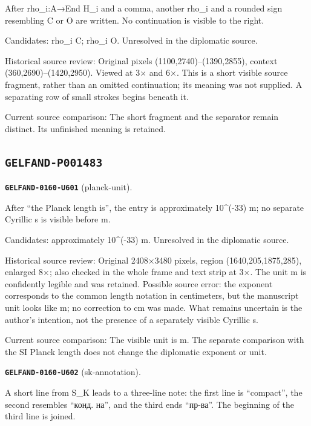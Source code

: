 After rho\_i:A→End H\_i and a comma, another rho\_i and a rounded sign resembling C or O are written. No continuation is visible to the right.\par
Candidates: rho\_i C; rho\_i O. Unresolved in the diplomatic source.\par
Historical source review: Original pixels (1100,2740)–(1390,2855), context (360,2690)–(1420,2950). Viewed at 3× and 6×. This is a short visible source fragment, rather than an omitted continuation; its meaning was not supplied. A separating row of small strokes begins beneath it.\par
Current source comparison: The short fragment and the separator remain distinct. Its unfinished meaning is retained.\par\medskip
\subsection*{\texttt{GELFAND-P001483}}
\par\noindent\leavevmode{}\label{GELFAND-0160-U601}\label{GELFAND-P001483:planck-unit}\textbf{\texttt{GELFAND-0160-U601}} (planck-unit).\nopagebreak[4]\par
After “the Planck length is”, the entry is approximately 10\textasciicircum{}(-33) m; no separate Cyrillic s is visible before m.\par
Candidates: approximately 10\textasciicircum{}(-33) m. Unresolved in the diplomatic source.\par
Historical source review: Original 2408×3480 pixels, region (1640,205,1875,285), enlarged 8×; also checked in the whole frame and text strip at 3×. The unit m is confidently legible and was retained. Possible source error: the exponent corresponds to the common length notation in centimeters, but the manuscript unit looks like m; no correction to cm was made. What remains uncertain is the author’s intention, not the presence of a separately visible Cyrillic s.\par
Current source comparison: The visible unit is m. The separate comparison with the SI Planck length does not change the diplomatic exponent or unit.\par\medskip
\par\noindent\leavevmode{}\label{GELFAND-0160-U602}\label{GELFAND-P001483:sk-annotation}\textbf{\texttt{GELFAND-0160-U602}} (sk-annotation).\nopagebreak[4]\par
A short line from S\_K leads to a three-line note: the first line is “compact”, the second resembles “конд. на”, and the third ends “пр-ва”. The beginning of the third line is joined.\par
